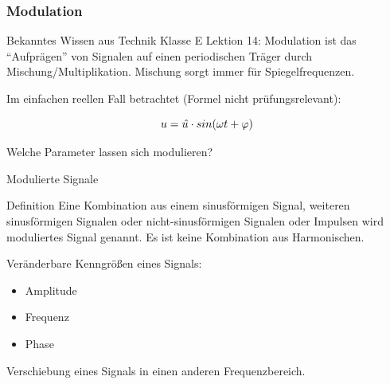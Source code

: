 \begin{frame}
  \frametitle{Modulation}

  \begin{block}{Bekanntes Wissen aus Technik Klasse E Lektion 14:}
    Modulation ist das "`Aufprägen"' von Signalen auf einen periodischen Träger
    durch Mischung/Multiplikation. Mischung sorgt immer für Spiegelfrequenzen.
  \end{block}

  \bigskip Im einfachen reellen Fall betrachtet (Formel nicht prüfungsrelevant):

  \begin{equation*}
    u = \skew{4}\hat{u} \cdot sin(\omega t + \varphi)
  \end{equation*}

  \vspace{2em}
  Welche Parameter lassen sich modulieren?

\end{frame}

\begin{frame}{Modulierte Signale}
  \begin{block}{Definition}
    Eine Kombination aus einem sinusförmigen Signal, weiteren sinusförmigen Signalen oder nicht-sinusförmigen Signalen oder Impulsen wird moduliertes Signal genannt. Es ist keine Kombination aus Harmonischen.
  \end{block}
  \vspace{2em}
  Veränderbare Kenngrößen eines Signals:
  \begin{itemize}
    \item Amplitude
    \item Frequenz
    \item Phase
  \end{itemize}
  \vspace{2em}
  Verschiebung eines Signals in einen anderen Frequenzbereich.
\end{frame}


